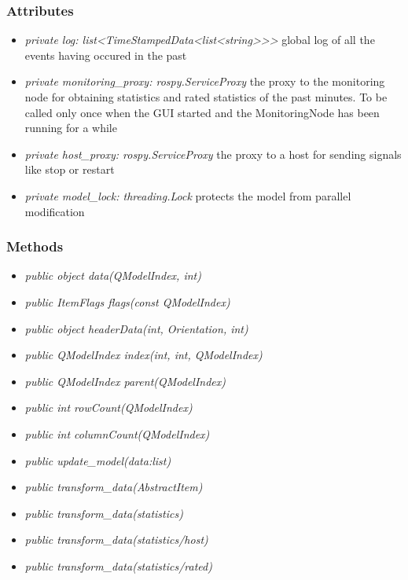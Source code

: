 \subsubsection{Attributes}
\begin{itemize}
  \item \textit{private log: list<TimeStampedData<list<string>>>} global log of all the events having occured in the past
  \item \textit{private monitoring\_proxy: rospy.ServiceProxy} the proxy to the monitoring node for obtaining statistics and rated statistics of the past minutes. To be called only once when the GUI started and the MonitoringNode has been running for a while 
  \item \textit{private host\_proxy: rospy.ServiceProxy} the proxy to a host for sending signals like stop or restart
  \item \textit{private model\_lock: threading.Lock} protects the model from parallel modification
\end{itemize}
\subsubsection{Methods}
\begin{itemize}
  \item \textit{public object data(QModelIndex, int)}
  \item \textit{public ItemFlags flags(const QModelIndex)}
  \item \textit{public object headerData(int, Orientation, int)}
  \item \textit{public QModelIndex index(int, int, QModelIndex)}
  \item \textit{public QModelIndex parent(QModelIndex)}
  \item \textit{public int rowCount(QModelIndex)}
  \item \textit{public int columnCount(QModelIndex)}
  \item \textit{public update\_model(data:list)}
  \item \textit{public transform\_data(AbstractItem)}
  \item \textit{public transform\_data(statistics)}
  \item \textit{public transform\_data(statistics/host)}
  \item \textit{public transform\_data(statistics/rated)}
  \end{itemize}

